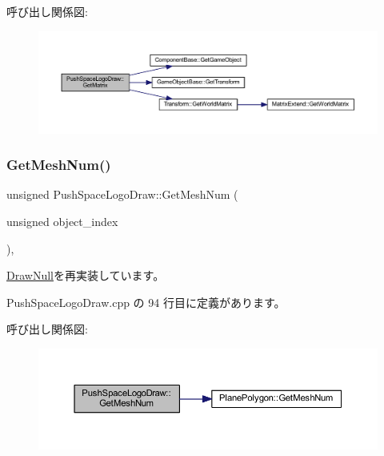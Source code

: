 呼び出し関係図\+:\nopagebreak
\begin{figure}[H]
\begin{center}
\leavevmode
\includegraphics[width=350pt]{class_push_space_logo_draw_a1ab6229ba2d68b730797f5016c99f359_cgraph}
\end{center}
\end{figure}
\mbox{\label{class_push_space_logo_draw_a9a40fca53e23b9970a7c5decaa3d2da6}} 
\subsubsection{\texorpdfstring{Get\+Mesh\+Num()}{GetMeshNum()}}
{\footnotesize\ttfamily unsigned Push\+Space\+Logo\+Draw\+::\+Get\+Mesh\+Num (\begin{DoxyParamCaption}\item[{unsigned}]{object\+\_\+index }\end{DoxyParamCaption})\hspace{0.3cm}{\ttfamily [override]}, {\ttfamily [virtual]}}



\mbox{\hyperlink{class_draw_null_ad735978a85a5f3583eecd82d6bfe6413}{Draw\+Null}}を再実装しています。



 Push\+Space\+Logo\+Draw.\+cpp の 94 行目に定義があります。

呼び出し関係図\+:\nopagebreak
\begin{figure}[H]
\begin{center}
\leavevmode
\includegraphics[width=350pt]{class_push_space_logo_draw_a9a40fca53e23b9970a7c5decaa3d2da6_cgraph}
\end{center}
\end{figure}
\mbox{\label{class_push_space_logo_draw_a7ad3fe53d9bda4ea16c958bc102ff54e}} 
